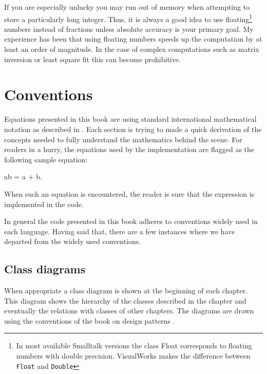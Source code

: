 \documentclass[twoside]{book}
\begin{document}
If you are especially unlucky you may run out of memory when
attempting to store a particularly long integer. Thus, it is
always a good idea to use floating\footnote{In most available
Smalltalk versions the class Float corresponds to floating numbers
with double precision. VisualWorks makes the difference between
{\tt Float} and {\tt Double}} numbers instead of fractions unless
absolute accuracy is your primary goal. My experience has been
that using floating numbers speeds up the computation by at least
an order of magnitude. In the case of complex computations such as
matrix inversion or least square fit this can become prohibitive.

\section{Conventions}
Equations presented in this book are using standard international
mathematical notation as described in \cite{Knuth1}. Each section
is trying to made a quick derivation of the concepts needed to
fully understand the mathematics behind the scene. For readers in
a hurry, the equations used by the implementation are flagged as
the following sample equation:
\begin{mainEquation}
\ln ab = \ln a + \ln b.
\end{mainEquation}
When such an equation is encountered, the reader is sure that the
expression is implemented in the code.

In general the code presented in this book adheres to conventions
widely used in each language. Having said that, there are a few
instances where we have departed from the widely used conventions.

\subsection{Class diagrams}
When appropriate a class diagram is shown at the beginning of each
chapter. This diagram shows the hierarchy of the classes described
in the chapter and eventually the relations with classes of other
chapters. The diagrams are drawn using the conventions of the book
on design patterns \cite{GoF}.
\end{document}
